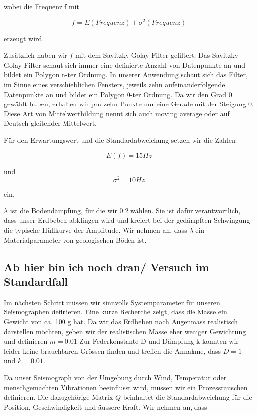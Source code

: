 wobei die Frequenz f mit

\begin{equation}
	f = E(Frequenz) + \sigma^2(Frequenz)
\end{equation}

erzeugt wird.

Zusätzlich haben wir $f$ mit dem Savitzky-Golay-Filter gefiltert.
Das Savitzky-Golay-Filter schaut sich immer eine definierte Anzahl von Datenpunkte an und bildet ein Polygon n-ter Ordnung. 
In unserer Anwendung schaut sich das Filter, im Sinne eines verschieblichen Fensters, jeweils zehn aufeinanderfolgende Datenpunkte an und bildet ein Polygon 0-ter Ordnung. 
Da wir den Grad 0 gewählt haben, erhalten wir pro zehn Punkte nur eine Gerade mit der Steigung 0. 
Diese Art von Mittelwertbildung nennt sich auch moving average oder auf Deutsch gleitender Mittelwert.

Für den Erwartungswert und die Standardabweichung setzen wir die Zahlen 

\begin{equation}
E(f) = 15 Hz
\end{equation}

und 
\begin{equation}
\sigma^2 = 10 Hz
\end{equation}

ein.

$\lambda$ ist die Bodendämpfung, für die wir 0.2 wählen.
Sie ist dafür verantwortlich, dass unser Erdbeben abklingen wird und kreiert bei der gedämpften Schwingung die typische Hüllkurve der Amplitude.
Wir nehmen an, dass $\lambda$ ein Materialparameter von geologischen Böden ist.

\subsection{Ab hier bin ich noch dran/ Versuch im Standardfall}
Im nächsten Schritt müssen wir sinnvolle Systemparameter für unseren Seismographen definieren.
Eine kurze Recherche zeigt, dass die Masse ein Gewicht von ca. 100 g hat.
Da wir das Erdbeben nach Augenmass realistisch darstellen möchten, geben wir der realistischen Masse eher weniger Gewichtung und definieren $m = 0.01$
Zur Federkonstante D und Dämpfung k konnten wir leider keine brauchbaren Grössen finden und treffen die Annahme, dass $D = 1$ und $k = 0.01$.

Da unser Seismograph von der Umgebung durch Wind, Temperatur oder menschgemachten Vibrationen beeinflusst wird, müssen wir ein Prozessrauschen definieren.
Die dazugehörige Matrix $Q$ beinhaltet die Standardabweichung für die Position, Geschwindigkeit und äussere Kraft.
Wir nehmen an, dass


